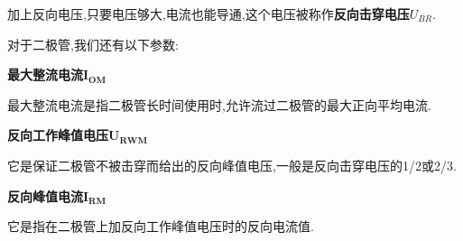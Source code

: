 \Par 加上反向电压,只要电压够大,电流也能导通,这个电压被称作\textbf{反向击穿电压$U_{BR}$}.

\Par 对于二极管,我们还有以下参数:

\textbf{最大整流电流$\boldsymbol{I}_{\mathbf{OM}}$}

最大整流电流是指二极管长时间使用时,允许流过二极管的最大正向平均电流.

\textbf{反向工作峰值电压$\boldsymbol{U}_{\mathbf{RWM}}$}

它是保证二极管不被击穿而给出的反向峰值电压,一般是反向击穿电压的1/2或2/3.

\textbf{反向峰值电流$\boldsymbol{I}_{\mathbf{RM}}$}

它是指在二极管上加反向工作峰值电压时的反向电流值.

